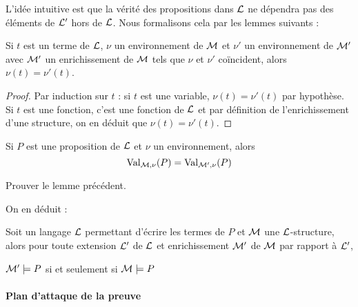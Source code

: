 L'idée intuitive est que la vérité des propositions dans $\mathcal L$ ne dépendra pas des éléments de $\mathcal L'$ hors de $\mathcal L$. Nous formalisons cela par les lemmes suivants :

\begin{lem}
    Si $t$ est un terme de $\mathcal L$, $\nu$ un environnement de $\mathcal M$ et $\nu'$ un environnement de $\mathcal M'$ avec $\mathcal M'$ un enrichissement de $\mathcal M$ tels que $\nu$ et $\nu'$ coïncident, alors $\nu(t)=\nu'(t)$.
\end{lem}

\begin{proof}
    Par induction sur $t$ : si $t$ est une variable, $\nu(t)=\nu'(t)$ par hypothèse. Si $t$ est une fonction, c'est une fonction de $\mathcal L$ et par définition de l'enrichissement d'une structure, on en déduit que $\nu(t)=\nu'(t)$.
\end{proof}

\begin{lem}
    Si $P$ est une proposition de $\mathcal L$ et $\nu$ un environnement, alors $$\mathrm{Val}_{\mathcal M,\nu}(P)=\mathrm{Val}_{\mathcal M',\nu}(P)$$
\end{lem}

\begin{exo}
    Prouver le lemme précédent.
\end{exo}

On en déduit :

\begin{prop}
    Soit un langage $\mathcal L$ permettant d'écrire les termes de $P$ et $\mathcal M$ une $\mathcal L$-structure, alors pour toute extension $\mathcal L'$ de $\mathcal L$ et enrichissement $\mathcal M'$ de $\mathcal M$ par rapport à $\mathcal L'$, \begin{center}
        $\mathcal M'\models P$ si et seulement si $\mathcal M\models P$
    \end{center}
\end{prop}

\paragraph{Plan d'attaque de la preuve}


